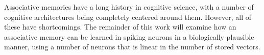 \documentclass[10pt,letterpaper]{article}
\begin{document}
Associative memories have a long history in cognitive science, with a number of cognitive architectures being completely centered around them. However, all of these have shortcomings. The remainder of this work will examine how an associative memory can be learned in spiking neurons in a biologically plausible manner, using a number of neurons that is linear in the number of stored vectors.

%
%
\end{document}
